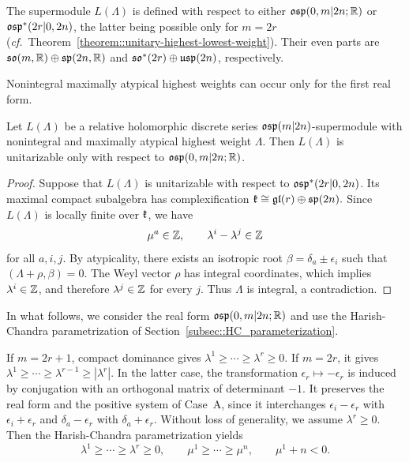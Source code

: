 The supermodule $L(\Lambda)$ is defined with respect to either ${\mathfrak{osp}}(0,m\vert2n;{\mathbb R})$ or ${\mathfrak{osp}}^{\ast}(2r\vert0,2n)$, the latter being possible only for $m=2r$ (\emph{cf.}~Theorem~\ref{theorem::unitary-highest-lowest-weight}). Their even parts are
$
{\mathfrak{so}}(m,{\mathbb R})\oplus{\mathfrak{sp}}(2n,{\mathbb R})
$ and $
{\mathfrak{so}}^*(2r)\oplus\mathfrak{usp}(2n)$,
respectively. 

Nonintegral maximally atypical highest weights can occur only for the first real form.

\begin{lemma}
Let $L(\Lambda)$ be a relative holomorphic discrete series ${\mathfrak{osp}}(m\vert2n)$-supermodule with nonintegral and maximally atypical highest weight $\Lambda$. Then $L(\Lambda)$ is unitarizable only with respect to ${\mathfrak{osp}}(0,m\vert2n;{\mathbb R})$.
\end{lemma}


\begin{proof}
Suppose that $L(\Lambda)$ is unitarizable with respect to ${\mathfrak{osp}}^{\ast}(2r\vert0,2n)$. Its maximal compact subalgebra has complexification
$
{\mathfrak k}\cong{\mathfrak{gl}}(r)\oplus{\mathfrak{sp}}(2n).
$
Since $L(\Lambda)$ is locally finite over ${\mathfrak k}$, we have
\[
\mu^a\in{\mathbb Z},
\qquad
\lambda^i-\lambda^j\in{\mathbb Z}
\]
for all $a,i,j$. By atypicality, there exists an isotropic root $\beta=\delta_a\pm\epsilon_i$ such that $(\Lambda+\rho,\beta)=0$. The Weyl vector $\rho$ has integral coordinates, which implies $\lambda^i\in{\mathbb Z}$, and therefore $\lambda^j\in{\mathbb Z}$ for every $j$. Thus $\Lambda$ is integral, a contradiction.
\end{proof}


In what follows, we consider the real form ${\mathfrak{osp}}(0,m\vert2n;{\mathbb R})$ and use the Harish-Chandra parametrization of Section~\ref{subsec::HC_parameterization}.

If $m=2r+1$, compact dominance gives
$
\lambda^1\geq\cdots\geq\lambda^r\geq0.
$
If $m=2r$, it gives
$
\lambda^1\geq\cdots\geq\lambda^{r-1}\geq|\lambda^r|.
$
In the latter case, the transformation
$
\epsilon_r\mapsto-\epsilon_r
$
is induced by conjugation with an orthogonal matrix of determinant $-1$. It preserves the real form and the positive system of Case~A, since it interchanges $\epsilon_i-\epsilon_r$ with $\epsilon_i+\epsilon_r$ and $\delta_a-\epsilon_r$ with $\delta_a+\epsilon_r$. Without loss of generality, we assume $\lambda^r\geq0$. Then the Harish-Chandra parametrization yields
\begin{equation}
\lambda^1\geq\cdots\geq\lambda^r\geq0,
\qquad
\mu^1\geq\cdots\geq\mu^n,
\qquad
\mu^1+n<0.
\end{equation}


